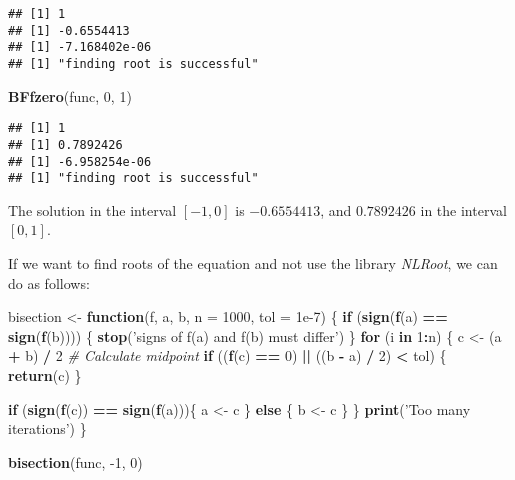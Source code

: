 \documentclass[]{article}
\newenvironment{Shaded}{\begin{snugshade}}{\end{snugshade}}
\newcommand{\CommentTok}[1]{\textcolor[rgb]{0.56,0.35,0.01}{\textit{#1}}}
\newcommand{\ControlFlowTok}[1]{\textcolor[rgb]{0.13,0.29,0.53}{\textbf{#1}}}
\newcommand{\DataTypeTok}[1]{\textcolor[rgb]{0.13,0.29,0.53}{#1}}
\newcommand{\DecValTok}[1]{\textcolor[rgb]{0.00,0.00,0.81}{#1}}
\newcommand{\FloatTok}[1]{\textcolor[rgb]{0.00,0.00,0.81}{#1}}
\newcommand{\KeywordTok}[1]{\textcolor[rgb]{0.13,0.29,0.53}{\textbf{#1}}}
\newcommand{\NormalTok}[1]{#1}
\newcommand{\OperatorTok}[1]{\textcolor[rgb]{0.81,0.36,0.00}{\textbf{#1}}}
\newcommand{\StringTok}[1]{\textcolor[rgb]{0.31,0.60,0.02}{#1}}
\begin{document}
\begin{verbatim}
## [1] 1
## [1] -0.6554413
## [1] -7.168402e-06
## [1] "finding root is successful"
\end{verbatim}

\begin{Shaded}
\begin{Highlighting}[]
\KeywordTok{BFfzero}\NormalTok{(func, }\DecValTok{0}\NormalTok{, }\DecValTok{1}\NormalTok{)}
\end{Highlighting}
\end{Shaded}

\begin{verbatim}
## [1] 1
## [1] 0.7892426
## [1] -6.958254e-06
## [1] "finding root is successful"
\end{verbatim}

The solution in the interval \([-1,0]\) is \(-0.6554413\), and
\(0.7892426\) in the interval \([0,1]\).

If we want to find roots of the equation and not use the library
\emph{NLRoot}, we can do as follows:

\begin{Shaded}
\begin{Highlighting}[]
\NormalTok{bisection <-}\StringTok{ }\ControlFlowTok{function}\NormalTok{(f, a, b, }\DataTypeTok{n =} \DecValTok{1000}\NormalTok{, }\DataTypeTok{tol =} \FloatTok{1e-7}\NormalTok{) \{}
    \ControlFlowTok{if}\NormalTok{ (}\KeywordTok{sign}\NormalTok{(}\KeywordTok{f}\NormalTok{(a) }\OperatorTok{==}\StringTok{ }\KeywordTok{sign}\NormalTok{(}\KeywordTok{f}\NormalTok{(b)))) \{}
    \KeywordTok{stop}\NormalTok{(}\StringTok{'signs of f(a) and f(b) must differ'}\NormalTok{)}
\NormalTok{  \}}
  \ControlFlowTok{for}\NormalTok{ (i }\ControlFlowTok{in} \DecValTok{1}\OperatorTok{:}\NormalTok{n) \{}
\NormalTok{    c <-}\StringTok{ }\NormalTok{(a }\OperatorTok{+}\StringTok{ }\NormalTok{b) }\OperatorTok{/}\StringTok{ }\DecValTok{2} \CommentTok{# Calculate midpoint}
    \ControlFlowTok{if}\NormalTok{ ((}\KeywordTok{f}\NormalTok{(c) }\OperatorTok{==}\StringTok{ }\DecValTok{0}\NormalTok{) }\OperatorTok{||}\StringTok{ }\NormalTok{((b }\OperatorTok{-}\StringTok{ }\NormalTok{a) }\OperatorTok{/}\StringTok{ }\DecValTok{2}\NormalTok{) }\OperatorTok{<}\StringTok{ }\NormalTok{tol) \{}
      \KeywordTok{return}\NormalTok{(c)}
\NormalTok{    \}}
    
    \ControlFlowTok{if}\NormalTok{ (}\KeywordTok{sign}\NormalTok{(}\KeywordTok{f}\NormalTok{(c)) }\OperatorTok{==}\StringTok{ }\KeywordTok{sign}\NormalTok{(}\KeywordTok{f}\NormalTok{(a)))\{}
\NormalTok{           a <-}\StringTok{ }\NormalTok{c}
\NormalTok{    \}}
    \ControlFlowTok{else}\NormalTok{ \{}
\NormalTok{      b <-}\StringTok{ }\NormalTok{c}
\NormalTok{    \}       }
\NormalTok{  \}}
  \KeywordTok{print}\NormalTok{(}\StringTok{'Too many iterations'}\NormalTok{)}
\NormalTok{\}}

\KeywordTok{bisection}\NormalTok{(func, }\DecValTok{-1}\NormalTok{, }\DecValTok{0}\NormalTok{)}
\end{Highlighting}
\end{Shaded}
\end{document}
